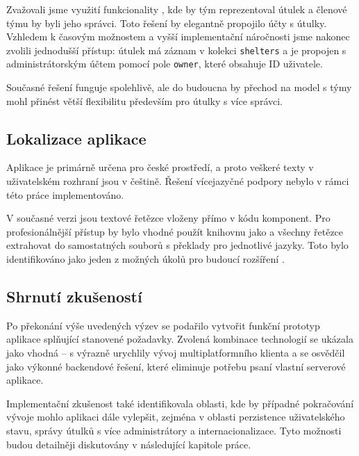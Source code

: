 \documentclass[czech, bp, kiv, he, iso690numb, pdf]{fasthesis}
\begin{document}
    Zvažovali jsme využití funkcionality , kde by tým reprezentoval útulek a členové týmu by byli jeho správci. Toto řešení by elegantně propojilo účty s útulky. Vzhledem k časovým možnostem a vyšší implementační náročnosti jsme nakonec zvolili jednodušší přístup: útulek má záznam v kolekci \texttt{shelters} a je propojen s administrátorským účtem pomocí pole \texttt{owner}, které obsahuje ID uživatele.

    Současné řešení funguje spolehlivě, ale do budoucna by přechod na model s týmy mohl přinést větší flexibilitu především pro útulky s více správci.

    \subsection*{Lokalizace aplikace}

    Aplikace je primárně určena pro české prostředí, a proto veškeré texty v uživatelském rozhraní jsou v češtině. Řešení vícejazyčné podpory nebylo v rámci této práce implementováno.

    V současné verzi jsou textové řetězce vloženy přímo v kódu komponent. Pro profesionálnější přístup by bylo vhodné použít knihovnu jako  a všechny řetězce extrahovat do samostatných souborů s překlady pro jednotlivé jazyky. Toto bylo identifikováno jako jeden z možných úkolů pro budoucí rozšíření \cite{reacti18next2025}.

    \subsection*{Shrnutí zkušeností}

    Po překonání výše uvedených výzev se podařilo vytvořit funkční prototyp aplikace splňující stanovené požadavky. Zvolená kombinace technologií se ukázala jako vhodná --  s  výrazně urychlily vývoj multiplatformního klienta a  se osvědčil jako výkonné backendové řešení, které eliminuje potřebu psaní vlastní serverové aplikace.

    Implementační zkušenost také identifikovala oblasti, kde by případné pokračování vývoje mohlo aplikaci dále vylepšit, zejména v oblasti perzistence uživatelského stavu, správy útulků s více administrátory a internacionalizace. Tyto možnosti budou detailněji diskutovány v následující kapitole práce.
\end{document}
